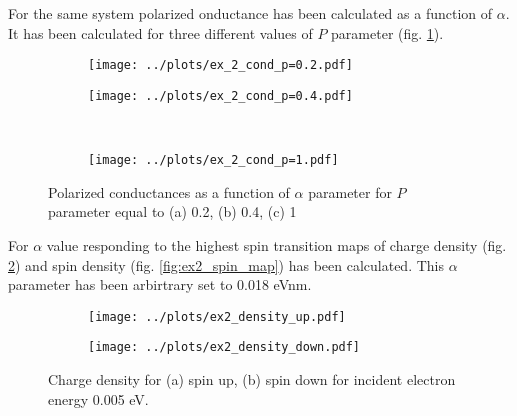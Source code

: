 \documentclass[a4paper, 12pt]{article}
\begin{document}
For the same system polarized onductance has been calculated as a function of $\alpha$.
It has been calculated for three different values of $P$ parameter (fig. \ref{fig:ex2_g_cond}).

\begin{figure}[h]
    \begin{center}
        \begin{subfigure}{0.49\textwidth}
            \texttt{[image: ../plots/ex\_2\_cond\_p=0.2.pdf]}
            \caption{}
        \end{subfigure}
        \begin{subfigure}{0.49\textwidth}
            \texttt{[image: ../plots/ex\_2\_cond\_p=0.4.pdf]}
            \caption{}
        \end{subfigure}
        \\
        \begin{subfigure}{0.49\textwidth}
            \texttt{[image: ../plots/ex\_2\_cond\_p=1.pdf]}
            \caption{}
        \end{subfigure}
    \end{center}
    \caption{Polarized conductances as a function of $\alpha$ parameter for $P$ parameter equal to (a) 0.2, (b) 0.4, (c) 1}
    \label{fig:ex2_g_cond}
\end{figure}

For $\alpha$ value responding to the highest spin transition maps of charge density (fig. \ref{fig:ex2_density_maps}) and spin density (fig. \ref{fig:ex2_spin_map}) has been calculated.
This $\alpha$ parameter has been arbirtrary set to 0.018 eVnm.

\begin{figure}[H]
    \begin{center}
        \begin{subfigure}{0.49\textwidth}
            \texttt{[image: ../plots/ex2\_density\_up.pdf]}
            \caption{}
        \end{subfigure}
        \begin{subfigure}{0.49\textwidth}
            \texttt{[image: ../plots/ex2\_density\_down.pdf]}
            \caption{}
        \end{subfigure}
    \end{center}
    \caption{Charge density for (a) spin up, (b) spin down for incident electron energy 0.005 eV.}
    \label{fig:ex2_density_maps}
\end{figure}
\end{document}
